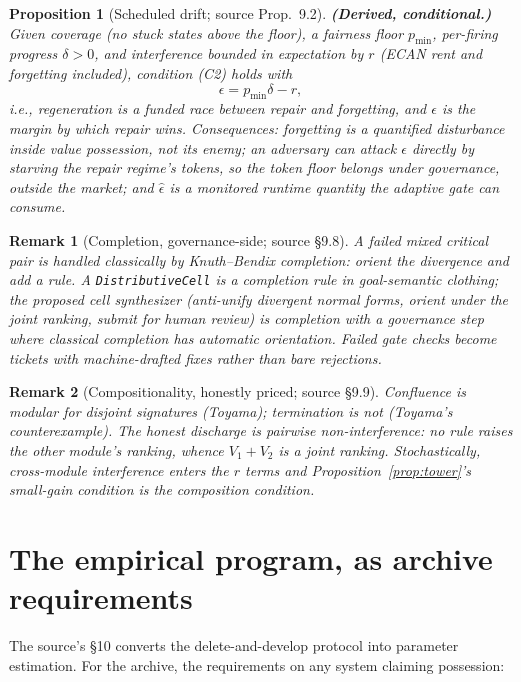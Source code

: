 \documentclass[11pt]{article}
\newtheorem{proposition}{Proposition}
\newtheorem{remark}{Remark}
\begin{document}
\begin{proposition}[Scheduled drift; source Prop.~9.2]
\textbf{(Derived, conditional.)} Given coverage (no stuck states above the floor),
a fairness floor $p_{\min}$, per-firing progress $\delta > 0$, and interference bounded
in expectation by $r$ (ECAN rent and forgetting included), condition (C2) holds with
\[
\epsilon = p_{\min}\delta - r,
\]
i.e., \emph{regeneration is a funded race between repair and forgetting, and $\epsilon$
is the margin by which repair wins.} Consequences: forgetting is a quantified
disturbance inside value possession, not its enemy; an adversary can attack $\epsilon$
directly by starving the repair regime's tokens, so the token floor belongs under
governance, outside the market; and $\hat\epsilon$ is a monitored runtime quantity the
adaptive gate can consume.
\end{proposition}

\begin{remark}[Completion, governance-side; source \S9.8]
A failed mixed critical pair is handled classically by Knuth--Bendix completion:
orient the divergence and add a rule. A \texttt{DistributiveCell} is a completion rule
in goal-semantic clothing; the proposed cell synthesizer (anti-unify divergent normal
forms, orient under the joint ranking, submit for human review) is completion with a
governance step where classical completion has automatic orientation. \emph{Failed gate
checks become tickets with machine-drafted fixes rather than bare rejections.}
\end{remark}

\begin{remark}[Compositionality, honestly priced; source \S9.9]
Confluence is modular for disjoint signatures (Toyama); termination is not (Toyama's
counterexample). The honest discharge is pairwise non-interference: no rule raises the
other module's ranking, whence $V_1 + V_2$ is a joint ranking. Stochastically,
cross-module interference enters the $r$ terms and Proposition~\ref{prop:tower}'s
small-gain condition is the composition condition.
\end{remark}

\section{The empirical program, as archive requirements}

The source's \S10 converts the delete-and-develop protocol into parameter estimation.
For the archive, the requirements on any system claiming possession:
\end{document}
